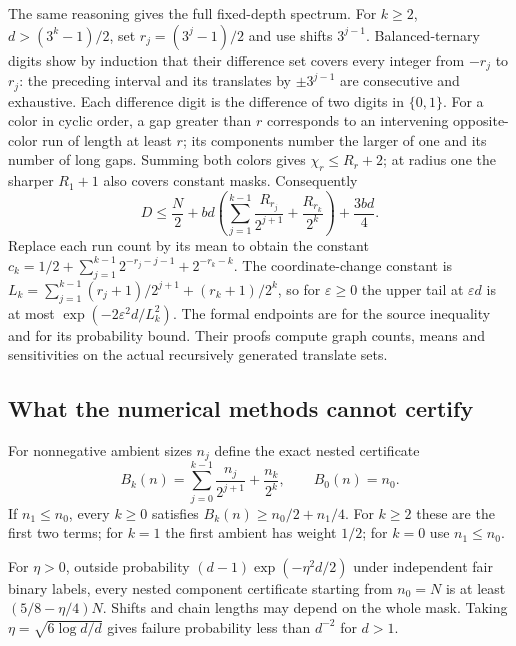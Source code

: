 The same reasoning gives the full fixed-depth spectrum. For $k\ge2$,
$d>(3^k-1)/2$, set $r_j=(3^j-1)/2$ and use shifts $3^{j-1}$. Balanced-ternary
digits show by induction that their difference set covers every integer
from $-r_j$ to $r_j$: the preceding interval and its translates by
$\pm3^{j-1}$ are consecutive and exhaustive. Each difference digit is
the difference of two digits in $\{0,1\}$. For a color in cyclic order,
a gap greater than $r$ corresponds to an intervening opposite-color run
of length at least $r$; its components number the larger of one and its
number of long gaps. Summing both colors gives $\chi_r\le R_r+2$;
at radius one the sharper $R_1+1$ also covers constant masks. Consequently
\[
 D\le\frac N2+bd\left(\sum_{j=1}^{k-1}\frac{R_{r_j}}{2^{j+1}}
                  +\frac{R_{r_k}}{2^k}\right)+\frac{3bd}4.
\]
Replace each run count by its mean to obtain the constant
$c_k=1/2+\sum_{j=1}^{k-1}2^{-r_j-j-1}+2^{-r_k-k}$. The coordinate-change
constant is $L_k=\sum_{j=1}^{k-1}(r_j+1)/2^{j+1}+(r_k+1)/2^k$, so for
$\varepsilon\ge0$ the upper tail at $\varepsilon d$ is at most
$\exp(-2\varepsilon^2d/L_k^2)$. The formal endpoints are
 for the source inequality
and  for its probability bound.
Their proofs compute graph counts, means and sensitivities on the actual
recursively generated translate sets.

\subsection{What the numerical methods cannot certify}

For nonnegative ambient sizes $n_j$ define the exact nested certificate
\[
 B_k(n)=\sum_{j=0}^{k-1}\frac{n_j}{2^{j+1}}+\frac{n_k}{2^k},
 \qquad B_0(n)=n_0.
\]
If $n_1\le n_0$, every $k\ge0$ satisfies
$B_k(n)\ge n_0/2+n_1/4$. For $k\ge2$ these are the first two terms;
for $k=1$ the first ambient has weight $1/2$; for $k=0$ use $n_1\le n_0$.

\begin{theorem}\label{thm:component-method-floor}
For $\eta>0$, outside probability
$(d-1)\exp(-\eta^2d/2)$ under independent fair binary labels, every
nested component certificate starting from $n_0=N$ is at least
$(5/8-\eta/4)N$. Shifts and chain lengths may depend on the whole mask.
Taking $\eta=\sqrt{6\log d/d}$ gives failure probability less than $d^{-2}$
for $d>1$.
\end{theorem}

